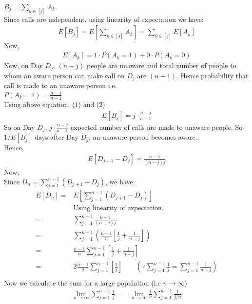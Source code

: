 \documentclass[12pt]{article}
\begin{document}
\begin{solution}
    $B_j=\sum_{k\in [j]} A_k$.\\
    Since calls are independent, using linearity of expectation we have:
    \begin{align*}
        E[B_j]=E[\sum_{k\in [j]} A_k]=\sum_{k\in [j]} E[A_k]\tag{1}
    \end{align*}
    Now,
    \begin{align*}
        E[A_k]=1\cdot P(A_k=1)+0\cdot P(A_k=0)\tag{2}
    \end{align*}
    Now, on Day $D_j$, $(n-j)$ people are unaware and total number of people to whom an aware person can make call on $D_j$ are $(n-1)$. Hence probability that call is made to an unaware person i.e.\\ $P(A_k=1)=\frac{n-j}{n-1}$\\ 
    
    Using above equation, (1) and (2)
    \begin{align*}
        E[B_j]=j\cdot \frac{n-j}{n-1}
    \end{align*}
    So on Day $D_j$, $j\cdot \frac{n-j}{n-1}$ expected number of calls are made to unaware people. 
    So $1/E[B_j]$ days after Day $D_j$, an unaware person becomes aware.\\
    Hence,
    \begin{align*}
        E[D_{j+1}-D_j]=\frac{n-1}{(n-j)j}
    \end{align*}
    Now,\\
    Since $D_n=\sum_{j=1}^{n-1}(D_{j+1}-D_j)$, we have:
    \begin{align*}
        E[D_n]=&E[\sum_{j=1}^{n-1}(D_{j+1}-D_j)]\\
        &\textrm{Using linearity of expectation,}\\
        =&\sum_{j=1}^{n-1}\frac{n-1}{(n-j)j}\\
        =&\sum_{j=1}^{n-1}(\frac{n-1}{n}[\frac{1}{j}+\frac{1}{n-j}])\\
        =&\frac{n-1}{n}\sum_{j=1}^{n-1}[\frac{1}{j}+\frac{1}{n-j}]\\
        =&2\frac{n-1}{n}\sum_{j=1}^{n-1}[\frac{1}{j}]\quad\quad(\because\sum_{j=1}^{n-1}\frac{1}{j}=\sum_{j=1}^{n-1}\frac{1}{n-j})\tag{3}\\
    \end{align*}
    Now we calculate the sum for a large population (i.e $n\rightarrow \infty$)
    \begin{align*}
        \lim_{n \to \infty}\sum_{j=1}^{n-1}\frac{1}{j}&=\lim_{n \to \infty}\frac{1}{n}\sum_{j=1}^{n-1}\frac{1}{j/n}\\

\end{align*}
\end{solution}
\end{document}
